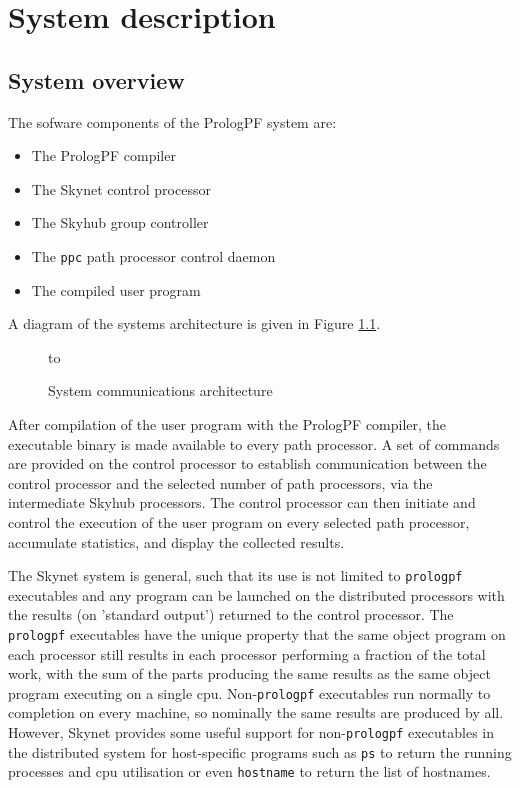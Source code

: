 \chapter{System description}
\label{system}

\section{System overview} %

The sofware components of the PrologPF system are:
\begin{itemize}
\item{The PrologPF compiler}
\item{The Skynet control processor}
\item{The Skyhub group controller}
\item{The \texttt{ppc} path processor control daemon}
\item{The compiled user program}
\end{itemize}

A diagram of the systems architecture is given in Figure \ref{system_diag}.

\begin{figure}[htb]
\vspace{5mm} \hbox to 
\caption{System communications architecture}
\vspace{5mm}
\label{system_diag}
\end{figure}

After compilation of the user program with the PrologPF compiler, the
executable binary is made available to every path processor.  A set of
commands are provided on the control processor to establish communication
between the control processor and the selected number of path processors,
via the intermediate Skyhub processors.  The control processor can then
initiate and control the execution of the user program on every selected
path processor, accumulate statistics, and display the collected results.

The Skynet system is general, such that its use is not limited to \texttt{prologpf}
executables and any program can be launched on the distributed processors with the
results (on 'standard output') returned to the control processor.  The \texttt{prologpf}
executables have the unique property that the same object program on each processor
still results in each processor performing a fraction of the total work, with the
sum of the parts producing the same results as the same object program executing on
a single cpu.  Non-\texttt{prologpf} executables run normally to completion on every
machine, so nominally the same results are produced by all.  However, Skynet provides
some useful support for non-\texttt{prologpf} executables in the distributed system for
host-specific programs such as \texttt{ps} to return the running processes and cpu
utilisation or even \texttt{hostname} to return the list of hostnames.

